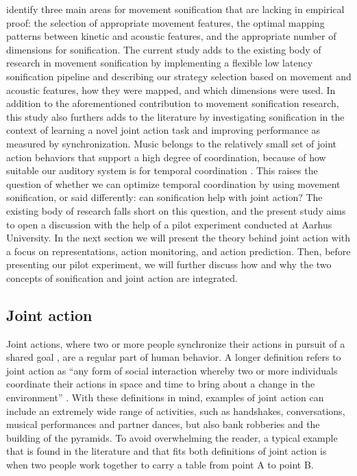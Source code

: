 \documentclass[10pt,a4paper,onecolumn]{article}
\begin{document}
\textcite{vinkenAuditoryCodingHuman2013} identify three main areas for movement sonification that are lacking in empirical proof: the selection of appropriate movement features, the optimal mapping patterns between kinetic and acoustic features, and the appropriate number of dimensions for sonification. The current study adds to the existing body of research in movement sonification by implementing a flexible low latency sonification pipeline and describing our strategy selection based on movement and acoustic features, how they were mapped, and which dimensions were used.
In addition to the aforementioned contribution to movement sonification research, this study also furthers adds to the literature by investigating sonification in the context of learning a novel joint action task and improving performance as measured by synchronization. Music belongs to the relatively small set of joint action behaviors that support a high degree of coordination, because of how suitable our auditory system is for temporal coordination \autocite{hildebrandtShortPaperEnhancing2014}. This raises the question of whether we can optimize temporal coordination by using movement sonification, or said differently: can sonification help with joint action? The existing body of research falls short on this question, and the present study aims to open a discussion with the help of a pilot experiment conducted at Aarhus University. In the next section we will present the theory behind joint action with a focus on representations, action monitoring, and action prediction. Then, before presenting our pilot experiment, we will further discuss how and why the two concepts of sonification and joint action are integrated.

\hypertarget{joint-action}{%
\subsection{Joint action}\label{joint-action}}

Joint actions, where two or more people synchronize their actions in pursuit of a shared goal \autocite{knoblichPsychologicalResearchJoint2011}, are a regular part of human behavior. A longer definition refers to joint action as ``any form of social interaction whereby two or more individuals coordinate their actions in space and time to bring about a change in the environment'' \autocite[p.~1]{sebanzJointActionBodies2006}. With these definitions in mind, examples of joint action can include an extremely wide range of activities, such as handshakes, conversations, musical performances and partner dances, but also bank robberies and the building of the pyramids. To avoid overwhelming the reader, a typical example that is found in the literature \autocite{sebanzJointActionBodies2006} and that fits both definitions of joint action is when two people work together to carry a table from point A to point B.
\end{document}
